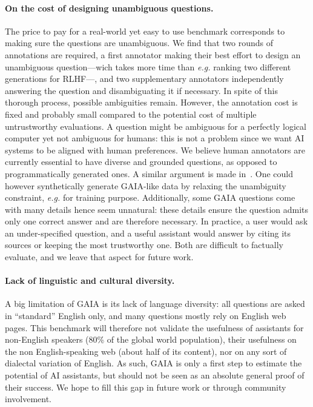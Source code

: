 \documentclass{fairmeta}
\newcommand{\benchmark}{\textsc{GAIA}}
\begin{document}
\paragraph{On the cost of designing unambiguous questions.} The price to pay for a real-world yet easy to use benchmark corresponds to making sure the questions are unambiguous. We find that two rounds of annotations are required, a first annotator making their best effort to design an unambiguous question---wich takes more time than \textit{e.g.} ranking two different generations for RLHF---, and two supplementary annotators independently answering the question and disambiguating it if necessary.
In spite of this thorough process, possible ambiguities remain. However, the annotation cost is fixed and probably small compared to the potential cost of multiple untrustworthy evaluations. A question might be ambiguous for a perfectly logical computer yet not ambiguous for humans: this is not a problem since we want AI systems to be aligned with human preferences. We believe human annotators are currently essential to have diverse and grounded questions, as opposed to programmatically generated ones. A similar argument is made in~\citet{chollet2019measure}. One could however synthetically generate GAIA-like data by relaxing the unambiguity constraint, \textit{e.g.} for training purpose.
Additionally, some \benchmark{} questions come with many details hence seem unnatural: these details ensure the question admits only one correct answer and are therefore necessary. In practice, a user would ask an under-specified question, and a useful assistant would answer by citing its sources or keeping the most trustworthy one. Both are difficult to factually evaluate, and we leave that aspect for future work. 

\paragraph{Lack of linguistic and cultural diversity.} A big limitation of \benchmark{} is its lack of language diversity: all questions are asked in ``standard'' English only, and many questions mostly rely on English web pages. This benchmark will therefore not validate the usefulness of assistants for non-English speakers (80\% of the global world population), their usefulness on the non English-speaking web (about half of its content), nor on any sort of dialectal variation of English. As such, \benchmark{} is only a first step to estimate the potential of AI assistants, but should not be seen as an absolute general proof of their success. We hope to fill this gap in future work or through community involvement.
\end{document}
